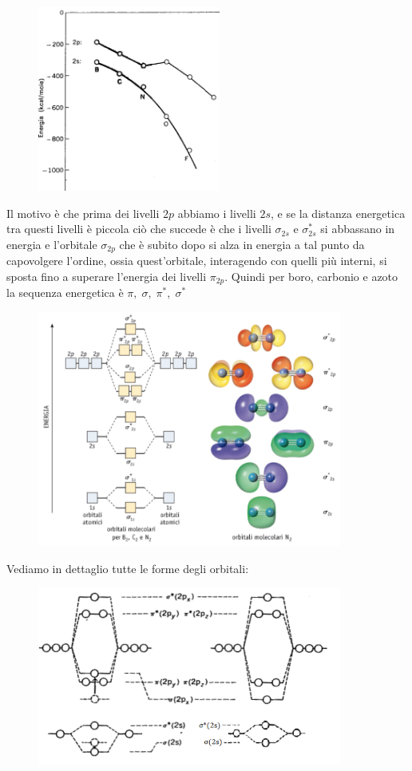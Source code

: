 \begin{figure}[htp]
    \centering
    \includegraphics[width=6cm]{immagini/differenza_energia_2s_2p.png}
\end{figure}

Il motivo è che prima dei livelli $2p$ abbiamo i livelli $2s$, e se la distanza energetica tra questi livelli è piccola ciò che succede è che i livelli $\sigma_{2s}$ e $\sigma_{2s}^*$ si abbassano in energia e l'orbitale $\sigma_{2p}$ che è subito dopo si alza in energia a tal punto da capovolgere l'ordine, ossia quest'orbitale, interagendo con quelli più interni, si sposta fino a superare l'energia dei livelli $\pi_{2p}$. Quindi per boro, carbonio e azoto la sequenza energetica è $\pi,\; \sigma, \; \pi^*, \; \sigma^*$

\begin{figure}[htp]
    \centering
    \includegraphics[width=10cm]{immagini/livelli_B2_C2_N2.png}
\end{figure}

Vediamo in dettaglio tutte le forme degli orbitali:

\begin{figure}[htp]
    \centering
    \includegraphics[width=10cm]{immagini/sequenza_energetica_BCN.png}
\end{figure}

